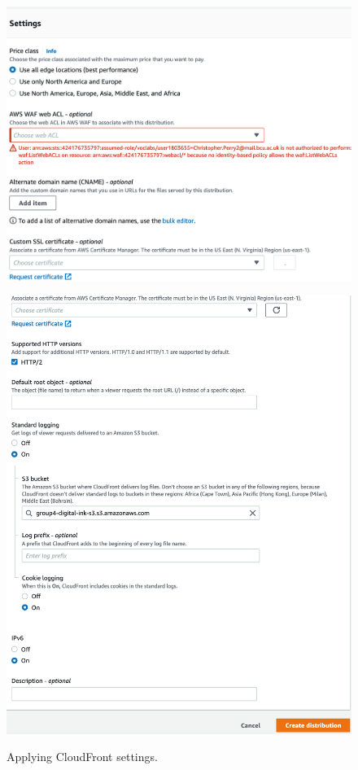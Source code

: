 \begin{figure}[!htbp]
    \centering
    \begin{minipage}{.5\textwidth}
        \centering
        \includegraphics[width=1\linewidth]{resources/cloudfront/cloudfront-settings-1}
        \label{fig:cloudfront-settings-1}
    \end{minipage}%
    \begin{minipage}{.5\textwidth}
        \centering
        \includegraphics[width=1\linewidth]{resources/cloudfront/cloudfront-settings-2}
        \label{fig:cloudfront-settings-2}
    \end{minipage}
    \caption{Applying CloudFront settings.}
    \label{fig:cloudfront-settings}
\end{figure}

